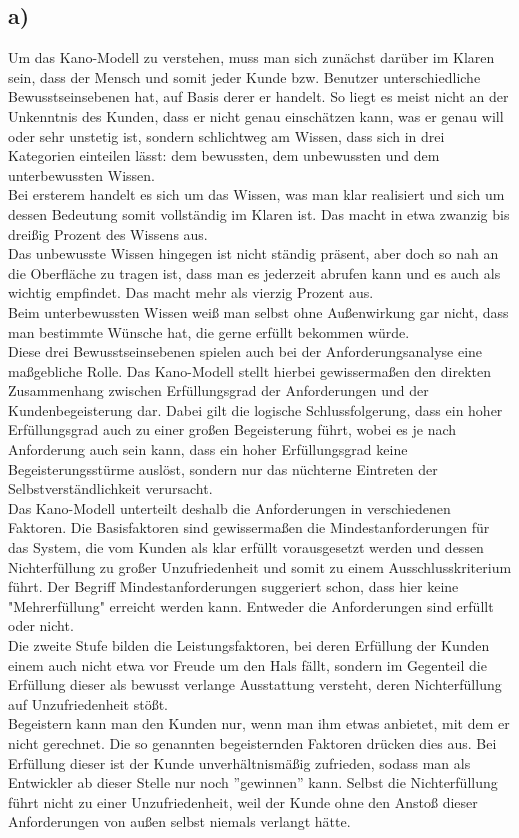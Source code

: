 \documentclass{swp1}
\begin{document}
\subsection*{a)}
Um das Kano-Modell zu verstehen, muss man sich zunächst darüber im Klaren sein, dass der Mensch und somit jeder Kunde bzw. Benutzer unterschiedliche Bewusstseinsebenen hat, auf Basis derer er handelt. So liegt es meist nicht an der Unkenntnis des Kunden, dass er nicht genau einschätzen kann, was er genau will oder sehr unstetig ist, sondern schlichtweg am Wissen, dass sich in drei Kategorien einteilen lässt: dem bewussten, dem unbewussten und dem unterbewussten Wissen.\\
Bei ersterem handelt es sich um das Wissen, was man klar realisiert und sich um dessen Bedeutung somit vollständig im Klaren ist. Das macht in etwa zwanzig bis dreißig Prozent des Wissens aus. \\
Das unbewusste Wissen hingegen ist nicht ständig präsent, aber doch so nah an die Oberfläche zu tragen ist, dass man es jederzeit abrufen kann und es auch als wichtig empfindet. Das macht mehr als vierzig Prozent aus.\\
Beim unterbewussten Wissen weiß man selbst ohne Außenwirkung gar nicht, dass man bestimmte Wünsche hat, die gerne erfüllt bekommen würde.\\

Diese drei Bewusstseinsebenen spielen auch bei der Anforderungsanalyse eine maßgebliche Rolle. Das Kano-Modell stellt hierbei gewissermaßen den direkten Zusammenhang zwischen Erfüllungsgrad der Anforderungen und der Kundenbegeisterung dar. Dabei gilt die logische Schlussfolgerung, dass ein hoher Erfüllungsgrad auch zu einer großen Begeisterung führt, wobei es je nach Anforderung auch sein kann, dass ein hoher Erfüllungsgrad keine Begeisterungsstürme auslöst, sondern nur das nüchterne Eintreten der Selbstverständlichkeit verursacht.\\
Das Kano-Modell unterteilt deshalb die Anforderungen in verschiedenen Faktoren. Die Basisfaktoren sind gewissermaßen die Mindestanforderungen für das System, die vom Kunden als klar erfüllt vorausgesetzt werden und dessen Nichterfüllung zu großer Unzufriedenheit und somit zu einem Ausschlusskriterium führt. Der Begriff Mindestanforderungen suggeriert schon, dass hier keine "Mehrerfüllung" erreicht werden kann. Entweder die Anforderungen sind erfüllt oder nicht. \\
Die zweite Stufe bilden die Leistungsfaktoren, bei deren Erfüllung der Kunden einem auch nicht etwa vor Freude um den Hals fällt, sondern im Gegenteil die Erfüllung dieser als bewusst verlange Ausstattung versteht, deren Nichterfüllung auf Unzufriedenheit stößt.\\
Begeistern kann man den Kunden nur, wenn man ihm etwas anbietet, mit dem er nicht gerechnet. Die so genannten begeisternden Faktoren drücken dies aus. Bei Erfüllung dieser ist der Kunde unverhältnismäßig zufrieden, sodass man als Entwickler ab dieser Stelle nur noch ''gewinnen'' kann. Selbst die Nichterfüllung führt nicht zu einer Unzufriedenheit, weil der Kunde ohne den Anstoß dieser Anforderungen von außen selbst niemals verlangt hätte.
\end{document}

